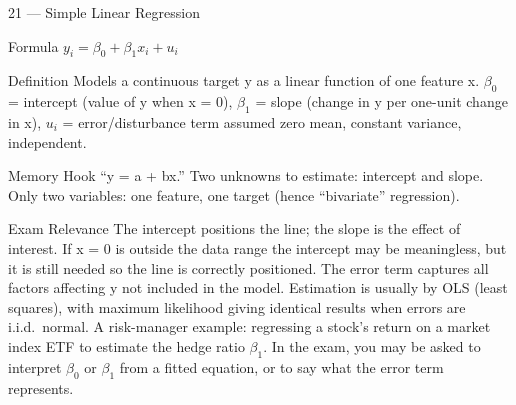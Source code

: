 \documentclass[aspectratio=169,8pt]{beamer}
\begin{document}
	\begin{frame}{21 --- Simple Linear Regression}
		\begin{block}{Formula}
			$y_i = \beta_0 + \beta_1 x_i + u_i$
		\end{block}
		\begin{block}{Definition}
			Models a continuous target y as a linear function of one feature x. $\beta_0$ = intercept (value of y when x = 0), $\beta_1$ = slope (change in y per one-unit change in x), $u_i$ = error/disturbance term assumed zero mean, constant variance, independent.
		\end{block}
		\begin{block}{Memory Hook}
			``y = a + bx.'' Two unknowns to estimate: intercept and slope. Only two variables: one feature, one target (hence ``bivariate'' regression).
		\end{block}
		\begin{block}{Exam Relevance}
			The intercept positions the line; the slope is the effect of interest. If x = 0 is outside the data range the intercept may be meaningless, but it is still needed so the line is correctly positioned. The error term captures all factors affecting y not included in the model. Estimation is usually by OLS (least squares), with maximum likelihood giving identical results when errors are i.i.d.\ normal. A risk-manager example: regressing a stock's return on a market index ETF to estimate the hedge ratio $\beta_1$. In the exam, you may be asked to interpret $\beta_0$ or $\beta_1$ from a fitted equation, or to say what the error term represents.
		\end{block}
	\end{frame}
	
\end{document}
